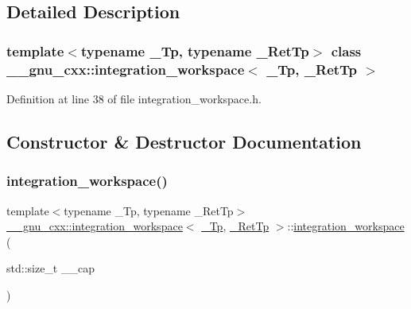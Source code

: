 \subsection{Detailed Description}
\subsubsection*{template$<$typename \+\_\+\+Tp, typename \+\_\+\+Ret\+Tp$>$\newline
class \+\_\+\+\_\+gnu\+\_\+cxx\+::integration\+\_\+workspace$<$ \+\_\+\+Tp, \+\_\+\+Ret\+Tp $>$}



Definition at line 38 of file integration\+\_\+workspace.\+h.



\subsection{Constructor \& Destructor Documentation}
\mbox{\label{class____gnu__cxx_1_1integration__workspace_a35a14f40924075a3ae17ff43626ef4e2}} 
\subsubsection{\texorpdfstring{integration\+\_\+workspace()}{integration\_workspace()}}
{\footnotesize\ttfamily template$<$typename \+\_\+\+Tp, typename \+\_\+\+Ret\+Tp$>$ \\
\hyperlink{class____gnu__cxx_1_1integration__workspace}{\+\_\+\+\_\+gnu\+\_\+cxx\+::integration\+\_\+workspace}$<$ \hyperlink{namespace____gnu__cxx_a3b19a9c800ca194374ef9172290f7d79}{\+\_\+\+Tp}, \hyperlink{namespace____gnu__cxx_a886e03ece3d53ff7fa6c098a40f93fa5}{\+\_\+\+Ret\+Tp} $>$\+::\hyperlink{class____gnu__cxx_1_1integration__workspace}{integration\+\_\+workspace} (\begin{DoxyParamCaption}\item[{std\+::size\+\_\+t}]{\+\_\+\+\_\+cap }\end{DoxyParamCaption})\hspace{0.3cm}{\ttfamily [inline]}}



